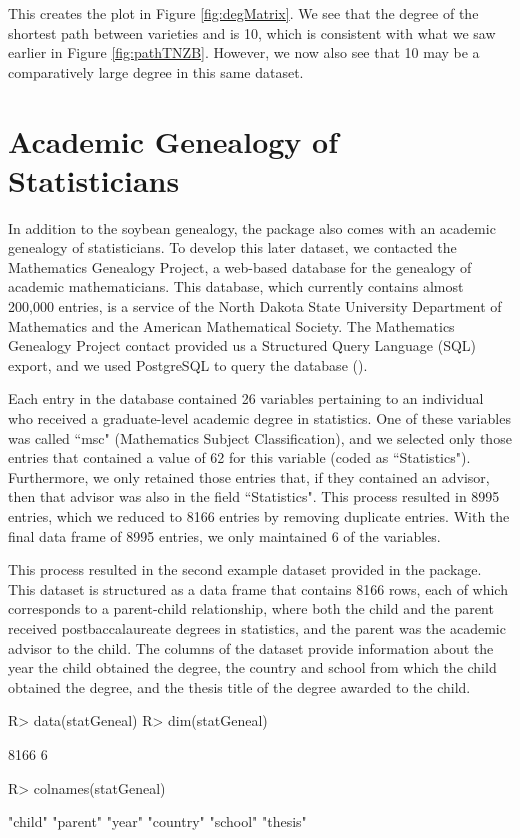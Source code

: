 \documentclass[article,shortnames]{jss}
\begin{document}
This creates the plot in Figure \ref{fig:degMatrix}. We see that the degree of the shortest path between varieties  and  is 10, which is consistent with what we saw earlier in Figure \ref{fig:pathTNZB}. However, we now also see that 10 may be a comparatively large degree in this same dataset.

\section{Academic Genealogy of Statisticians}

In addition to the soybean genealogy, the  package also comes with an academic genealogy of statisticians. To develop this later dataset, we contacted the Mathematics Genealogy Project, a web-based database for the genealogy of academic mathematicians. This database, which currently contains almost 200,000 entries, is a service of the North Dakota State University Department of Mathematics and the American Mathematical Society. The Mathematics Genealogy Project contact provided us a Structured Query Language (SQL) export, and we used PostgreSQL to query the database (\citealt{psql}).

Each entry in the database contained 26 variables pertaining to an individual who received a graduate-level academic degree in statistics. One of these variables was called ``msc" (Mathematics Subject Classification), and we selected only those entries that contained a value of 62 for this variable (coded as ``Statistics"). Furthermore, we only retained those entries that, if they contained an advisor, then that advisor was also in the field ``Statistics". This process resulted in 8995 entries, which we reduced to 8166 entries by removing duplicate entries. With the final data frame of 8995 entries, we only maintained 6 of the variables.

This process resulted in the second example dataset provided in the  package. This dataset is structured as a data frame that contains 8166 rows, each of which corresponds to a parent-child relationship, where both the child and the parent received postbaccalaureate degrees in statistics, and the parent was the academic advisor to the child. The columns of the dataset provide information about the year the child obtained the degree, the country and school from which the child obtained the degree, and the thesis title of the degree awarded to the child.

\begin{CodeChunk}
\begin{CodeInput}
R> data(statGeneal)
R> dim(statGeneal)
\end{CodeInput}
\begin{CodeOutput}
[1] 8166    6
\end{CodeOutput}
\begin{CodeInput}
R> colnames(statGeneal)
\end{CodeInput}
\begin{CodeOutput}
[1] "child"   "parent"  "year"    "country" "school"  "thesis"
\end{CodeOutput}
\end{CodeChunk}
\end{document}
